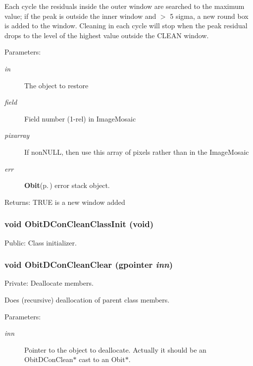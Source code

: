Each cycle the residuals inside the outer window are searched to the maximum value; if the peak is outside the inner window and $>$ 5 sigma, a new round box is added to the window. Cleaning in each cycle will stop when the peak residual drops to the level of the highest value outside the CLEAN window. \begin{Desc}
\item[Parameters:]
\begin{description}
\item[{\em in}]The object to restore \item[{\em field}]Field number (1-rel) in Image\-Mosaic \item[{\em pixarray}]If non\-NULL, then use this array of pixels rather than in the Image\-Mosaic \item[{\em err}]{\bf Obit}{\rm (p.\,\pageref{structObit})} error stack object. \end{description}
\end{Desc}
\begin{Desc}
\item[Returns:]TRUE is a new window added \end{Desc}
\subsubsection{\setlength{\rightskip}{0pt plus 5cm}void Obit\-DCon\-Clean\-Class\-Init (void)}\label{ObitDConClean_8c_a28}


Public: Class initializer. 

\subsubsection{\setlength{\rightskip}{0pt plus 5cm}void Obit\-DCon\-Clean\-Clear (gpointer {\em inn})}\label{ObitDConClean_8c_a4}


Private: Deallocate members. 

Does (recursive) deallocation of parent class members. \begin{Desc}
\item[Parameters:]
\begin{description}
\item[{\em inn}]Pointer to the object to deallocate. Actually it should be an Obit\-DCon\-Clean$\ast$ cast to an Obit$\ast$. \end{description}
\end{Desc}
